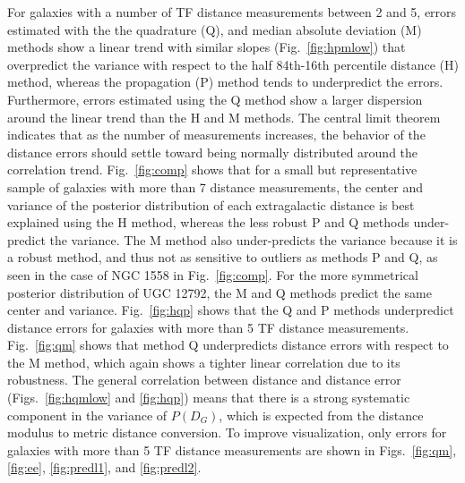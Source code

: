 \documentclass[a4paper,fleqn,usenatbib]{mnras}
\begin{document}
For galaxies with a number of TF distance measurements between 2 and 5, errors estimated with the the quadrature (Q), and median absolute deviation (M) methods show a linear trend with similar slopes (Fig.~\ref{fig:hpmlow}) that overpredict the variance with respect to the half 84th-16th percentile distance (H) method, whereas the propagation (P) method tends to underpredict the errors. Furthermore, errors estimated using the Q method show a larger dispersion around the linear trend than the H and M methods. The central limit theorem indicates that as the number of measurements increases, the behavior of the distance errors should settle toward being normally distributed around the correlation trend. Fig.~\ref{fig:comp} shows that for a small but representative sample of galaxies with more than 7 distance measurements, the center and variance of the posterior distribution of each extragalactic distance is best explained using the H method, whereas the less robust P and Q methods under-predict the variance. The M method also under-predicts the variance because it is a robust method, and thus not as sensitive to outliers as methods P and Q, as seen in the case of NGC 1558 in Fig.~\ref{fig:comp}. For the more symmetrical posterior distribution of UGC 12792, the M and Q methods predict the same center and variance. Fig.~\ref{fig:hqp} shows that the Q and P methods underpredict distance errors for galaxies with more than 5 TF distance measurements. Fig.~\ref{fig:qm} shows that method Q underpredicts distance errors with respect to the M method, which again shows a tighter linear correlation due to its robustness. The general correlation between distance and distance error (Figs.~\ref{fig:hqmlow} and \ref{fig:hqp}) means that there is a strong systematic component in the variance of $P(D_G)$, which is expected from the distance modulus to metric distance conversion. To improve visualization, only errors for galaxies with more than 5 TF distance measurements are shown in Figs.~\ref{fig:qm}, \ref{fig:ee}, \ref{fig:predl1}, and \ref{fig:predl2}.\\
\end{document}
